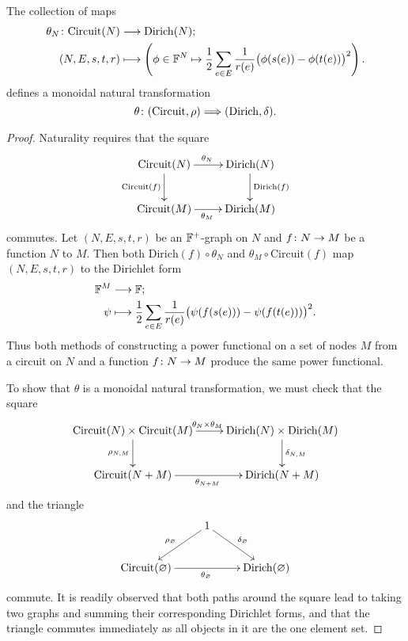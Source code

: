 \begin{proposition} 
  The collection of maps
\begin{align*}
  \theta_N{\colon} \mathrm{Circuit}(N) &\longrightarrow \mathrm{Dirich}(N); \\
  (N,E,s,t,r) &\longmapsto \left(\phi \in {\mathbb F}^N \mapsto \frac{1}{2} \sum_{e \in E}
  \frac{1}{r(e)}\big(\phi(s(e))-\phi(t(e))\big)^2\right).
\end{align*}
defines a monoidal natural transformation
\[
  \theta{\colon} (\mathrm{Circuit},\rho) \Longrightarrow
  (\mathrm{Dirich},\delta).
\]
\end{proposition}
\begin{proof}
Naturality requires that the square
\[
  \xymatrix{
    \mathrm{Circuit}(N) \ar[r]^{\theta_N} \ar[d]_{\mathrm{Circuit}(f)} &
    \mathrm{Dirich}(N) \ar[d]^{\mathrm{Dirich}(f)}  \\
    \mathrm{Circuit}(M) \ar[r]_{\theta_M} & \mathrm{Dirich}(M)
  }
\]
commutes. Let $(N,E,s,t,r)$ be an ${\mathbb F}^+$-graph on $N$ and $f{\colon} N \to M$ be a
function $N$ to $M$. Then both $\mathrm{Dirich}(f) \circ \theta_N$ and $\theta_M
\circ \mathrm{Circuit}(f)$ map $(N,E,s,t,r)$ to the Dirichlet form
\begin{align*}
  {\mathbb F}^M &\longrightarrow {\mathbb F};\\
  \psi &\longmapsto \frac{1}{2} \sum_{e \in E}\frac{1}{r(e)}
  \big(\psi(f(s(e)))-\psi(f(t(e)))\big)^2.
\end{align*}
Thus both methods of constructing a power functional on a set of nodes $M$ from
a circuit on $N$ and a function $f{\colon} N \to M$ produce the same power functional.

To show that $\theta$ is a monoidal natural transformation, we must check that
the square
\[
\xymatrix{
  \mathrm{Circuit}(N) \times \mathrm{Circuit}(M) \ar[r]^{\theta_N \times
  \theta_M} \ar[d]_{\rho_{N,M}} & \mathrm{Dirich}(N) \times \mathrm{Dirich}(M)
  \ar[d]^{\delta_{N,M}}  \\
  \mathrm{Circuit}(N+M) \ar[r]_{\theta_{N+M}} & \mathrm{Dirich}(N+M)
}
\]
and the triangle
\[
\xymatrix{
  & 1 \ar[dl]_{\rho_\varnothing} \ar[dr]^{\delta_\varnothing}\\
\mathrm{Circuit}(\varnothing)  \ar[rr]_{\theta_\varnothing} &&
\mathrm{Dirich}(\varnothing)
}
\]
commute. It is readily observed that both paths around the square lead to taking
two graphs and summing their corresponding Dirichlet forms, and that the
triangle commutes immediately as all objects in it are the one element set.
\end{proof}

